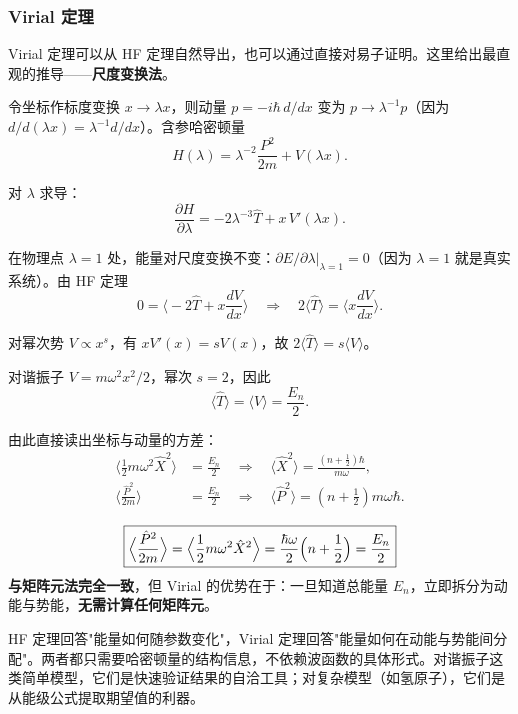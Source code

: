 \subsubsection{Virial 定理}

Virial 定理可以从 HF 定理自然导出，也可以通过直接对易子证明。这里给出最直观的推导——\textbf{尺度变换法}。

\begin{derivationbox}
令坐标作标度变换 $x\to\lambda x$，则动量 $p = -i\hbar\,d/dx$ 变为 $p\to\lambda^{-1}p$（因为 $d/d(\lambda x) = \lambda^{-1}d/dx$）。含参哈密顿量
\[
H(\lambda) = \lambda^{-2}\frac{P^2}{2m} + V(\lambda x).
\]

对 $\lambda$ 求导：
\[
\frac{\partial H}{\partial\lambda} = -2\lambda^{-3}\hat{T} + x\,V'(\lambda x).
\]

在物理点 $\lambda=1$ 处，能量对尺度变换不变：$\partial E/\partial\lambda|_{\lambda=1}=0$（因为 $\lambda=1$ 就是真实系统）。由 HF 定理
\[
0 = \Big\langle -2\hat{T} + x\frac{dV}{dx}\Big\rangle
\quad\Longrightarrow\quad
\boxed{2\langle\hat{T}\rangle = \Big\langle x\frac{dV}{dx}\Big\rangle.}
\]

对幂次势 $V\propto x^s$，有 $xV'(x) = sV(x)$，故 $2\langle\hat{T}\rangle = s\langle V\rangle$。
\end{derivationbox}

对谐振子 $V = m\omega^2x^2/2$，幂次 $s=2$，因此
\[
\langle\hat{T}\rangle = \langle V\rangle = \frac{E_n}{2}.
\]

由此直接读出坐标与动量的方差：
\begin{align}
\Big\langle\frac12m\omega^2\hat{X}^2\Big\rangle &= \frac{E_n}{2}
\quad\Longrightarrow\quad
\langle\hat{X}^2\rangle = \frac{(n+\tfrac12)\hbar}{m\omega}, \\
\Big\langle\frac{\hat{P}^2}{2m}\Big\rangle &= \frac{E_n}{2}
\quad\Longrightarrow\quad
\langle\hat{P}^2\rangle = (n+\tfrac12)m\omega\hbar.
\end{align}

\begin{formulabox}
\[
\boxed{\Big\langle\frac{\hat{P}^2}{2m}\Big\rangle = \Big\langle\frac12m\omega^2\hat{X}^2\Big\rangle
= \frac{\hbar\omega}{2}\Bigl(n+\frac12\Bigr) = \frac{E_n}{2}}
\]
\textbf{与矩阵元法完全一致}，但 Virial 的优势在于：一旦知道总能量 $E_n$，立即拆分为动能与势能，\textbf{无需计算任何矩阵元}。
\end{formulabox}

\begin{insightbox}
HF 定理回答"能量如何随参数变化"，Virial 定理回答"能量如何在动能与势能间分配"。两者都只需要哈密顿量的结构信息，不依赖波函数的具体形式。对谐振子这类简单模型，它们是快速验证结果的自洽工具；对复杂模型（如氢原子），它们是从能级公式提取期望值的利器。
\end{insightbox}
